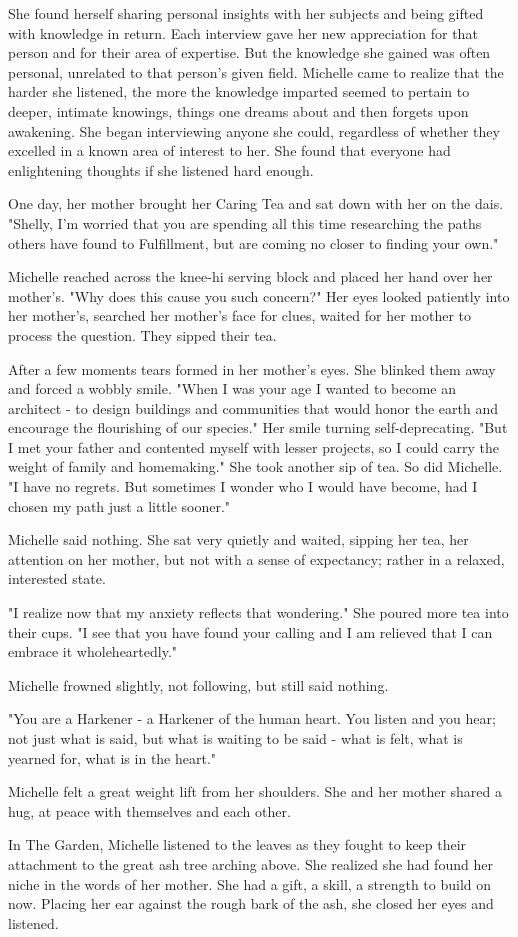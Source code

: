 She found herself sharing personal insights with her subjects and being
gifted with knowledge in return. Each interview gave her new
appreciation for that person and for their area of expertise. But the
knowledge she gained was often personal, unrelated to that person's
given field. Michelle came to realize that the harder she listened, the
more the knowledge imparted seemed to pertain to deeper, intimate
knowings, things one dreams about and then forgets upon awakening. She
began interviewing anyone she could, regardless of whether they excelled
in a known area of interest to her. She found that everyone had
enlightening thoughts if she listened hard enough.

One day, her mother brought her Caring Tea and sat down with her on the
dais. "Shelly, I'm worried that you are spending all this time
researching the paths others have found to Fulfillment, but are coming
no closer to finding your own."

Michelle reached across the knee-hi serving block and placed her hand
over her mother's. "Why does this cause you such concern?" Her eyes
looked patiently into her mother's, searched her mother's face for
clues, waited for her mother to process the question. They sipped their
tea.

After a few moments tears formed in her mother's eyes. She blinked them
away and forced a wobbly smile. "When I was your age I wanted to become
an architect - to design buildings and communities that would honor the
earth and encourage the flourishing of our species." Her smile turning
self-deprecating. "But I met your father and contented myself with
lesser projects, so I could carry the weight of family and homemaking."
She took another sip of tea. So did Michelle. "I have no regrets. But
sometimes I wonder who I would have become, had I chosen my path just a
little sooner."

Michelle said nothing. She sat very quietly and waited, sipping her tea,
her attention on her mother, but not with a sense of expectancy; rather
in a relaxed, interested state.

"I realize now that my anxiety reflects that wondering." She poured more
tea into their cups. "I see that you have found your calling and I am
relieved that I can embrace it wholeheartedly."

Michelle frowned slightly, not following, but still said nothing.

"You are a Harkener - a Harkener of the human heart. You listen and you
hear; not just what is said, but what is waiting to be said - what is
felt, what is yearned for, what is in the heart."

Michelle felt a great weight lift from her shoulders. She and her mother
shared a hug, at peace with themselves and each other.

In The Garden, Michelle listened to the leaves as they fought to keep
their attachment to the great ash tree arching above. She realized she
had found her niche in the words of her mother. She had a gift, a skill,
a strength to build on now. Placing her ear against the rough bark of
the ash, she closed her eyes and listened.
